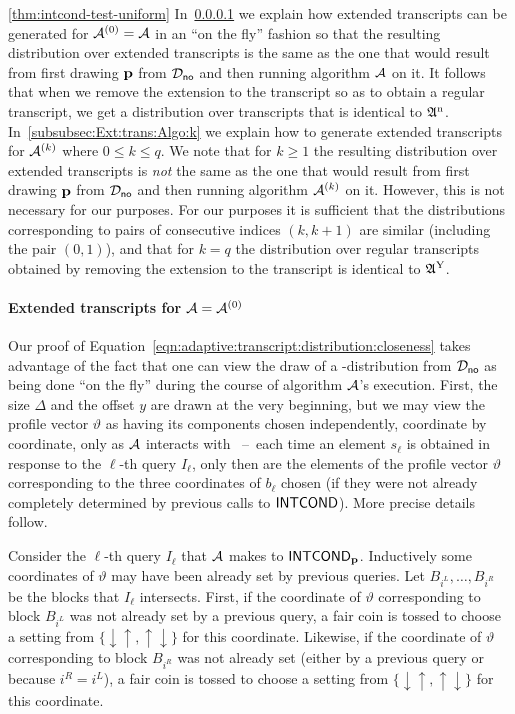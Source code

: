\begin{proofof}{\cref{thm:intcond-test-uniform}}
In~\cref{subsubsec:Ext:trans:Algo} we explain how extended transcripts
can be generated for $\mathcal{A}^{(0)}=\mathcal{A}$ in an ``on the fly'' fashion so that the resulting distribution
over extended transcripts is the same as the one that would result from first
drawing $\mathbf{p}$ from $\mathcal{D}_{\textsf{no}}$ and then running algorithm $\mathcal{A}$ on it.
It follows that when we remove the extension to the transcript so as to obtain
a regular transcript, we get a distribution over transcripts that is identical to
$\mathfrak{A}^{\rm n}$.
In~\cref{subsubsec:Ext:trans:Algo:k} we explain how to generate extended
transcripts for $\mathcal{A}^{(k)}$ where $0 \leq k \leq q$.
We note that for $k\geq 1$
the resulting distribution over extended transcripts is \emph{not} the same as
the one that would result from first
drawing $\mathbf{p}$ from $\mathcal{D}_{\textsf{no}}$ and then running algorithm $\mathcal{A}^{(k)}$ on it.
However, this is not necessary for our purposes. For our purposes it is sufficient that
the distributions corresponding to pairs of consecutive indices $(k,k+1)$ are similar (including
the pair $(0,1)$), and that for $k=q$
the distribution over regular transcripts obtained by removing the extension to the transcript
is identical to $\mathfrak{A}^{\rm Y}$.

\paragraph{Extended transcripts for $\mathcal{A} = \mathcal{A}^{(0)}$}
\label{subsubsec:Ext:trans:Algo}
Our proof of Equation~\eqref{eqn:adaptive:transcript:distribution:closeness}
takes advantage of the fact that one can view the
 draw of a \no-distribution from $\mathcal{D}_{\textsf{no}}$ as being done ``on the fly''
 during the course of algorithm $\mathcal{A}$'s execution.
First, the size $\Delta$ and the offset $y$ are drawn at the very beginning, but we may view
the profile vector $\vartheta$ as having its components chosen
independently, coordinate by coordinate, only as $\mathcal{A}$ interacts with
\ICOND~--~each time an element $s_\ell$ is obtained in response to the
$\ell$-th query $I_\ell$, only then
are the elements of the profile vector $\vartheta$ corresponding to the
three coordinates of $b_\ell$ chosen
(if they were not already completely
determined by previous calls to ${\sf INTCOND}$).
More precise details follow.


Consider the $\ell$-th query $I_\ell$ that $\mathcal{A}$ makes to ${\sf INTCOND}_{\mathbf{p}}$.  Inductively some coordinates of $\vartheta$ may have been already set by previous queries.
Let $B_{i^L},\dots,B_{i^R}$ be the blocks that $I_\ell$ intersects.
First, if the coordinate of $\vartheta$ corresponding to block $B_{i^L}$ was
not already set by a previous query, a fair
coin is tossed to choose a
setting from $\{\downarrow\uparrow,\uparrow\downarrow\}$ for this coordinate.
Likewise, if the coordinate of $\vartheta$ corresponding to block $B_{i^R}$
was not already set (either by a previous query or because $i^R = i^L$), a fair
coin is tossed to choose a
setting from $\{\downarrow\uparrow,\uparrow\downarrow\}$ for this coordinate.


\end{proofof}
